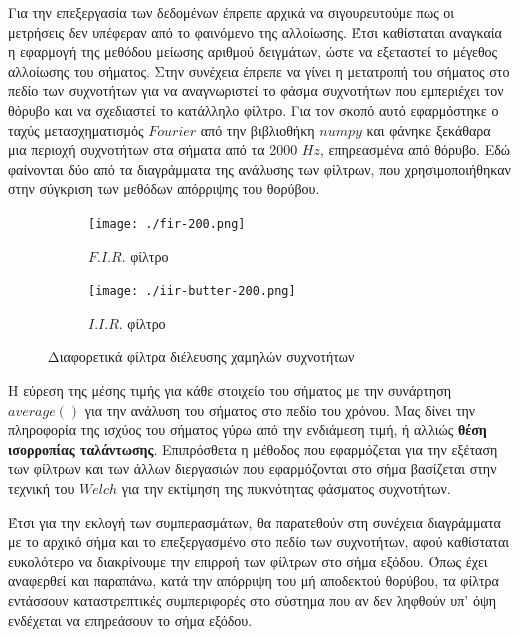 \documentclass[breaklines=true, 12pt]{article}
\begin{document}
Για την επεξεργασία των δεδομένων έπρεπε αρχικά να σιγουρευτούμε πως οι
μετρήσεις δεν υπέφεραν από το φαινόμενο της αλλοίωσης. Έτσι καθίσταται
αναγκαία η εφαρμογή της μεθόδου μείωσης αριθμού δειγμάτων, ώστε να εξεταστεί
το μέγεθος αλλοίωσης του σήματος. Στην συνέχεια έπρεπε να γίνει η μετατροπή
του σήματος στο πεδίο των συχνοτήτων για να αναγνωριστεί το φάσμα συχνοτήτων
που εμπεριέχει τον θόρυβο και να σχεδιαστεί το κατάλληλο φίλτρο. Για τον σκοπό
αυτό εφαρμόστηκε ο ταχύς μετασχηματισμός \(Fourier\) από την βιβλιοθήκη \(numpy\) και
φάνηκε ξεκάθαρα μια περιοχή συχνοτήτων στα σήματα από τα 2000 \(Hz\), επηρεασμένα
από θόρυβο. Εδώ φαίνονται δύο από τα διαγράμματα της ανάλυσης των φίλτρων, που
χρησιμοποιήθηκαν στην σύγκριση των μεθόδων απόρριψης του θορύβου.
\begin{figure}
\centering
\begin{subfigure}{.5\textwidth}
\centering
\texttt{[image: ./fir-200.png]}
\caption{\(F.I.R.\) φίλτρο}
\label{fig:sub1}
\end{subfigure}%
\begin{subfigure}{.5\textwidth}
\centering
\texttt{[image: ./iir-butter-200.png]}
\caption{\(I.I.R.\) φίλτρο}
\label{fig:sub2}
\end{subfigure}
\caption{Διαφορετικά φίλτρα διέλευσης χαμηλών συχνοτήτων}
\label{fig:test}
\end{figure}

Η εύρεση της μέσης τιμής για κάθε στοιχείο του σήματος με την συνάρτηση
\(average()\) για την ανάλυση του σήματος στο πεδίο του
χρόνου. Μας δίνει την πληροφορία της ισχύος του σήματος γύρω από την ενδιάμεση
τιμή, ή αλλιώς \textbf{θέση ισορροπίας ταλάντωσης}. Επιπρόσθετα η μέθοδος που
εφαρμόζεται για την εξέταση των φίλτρων και των άλλων διεργασιών που
εφαρμόζονται στο σήμα βασίζεται στην τεχνική του \(Welch\) για την εκτίμηση της
πυκνότητας φάσματος συχνοτήτων.

Έτσι για την εκλογή των συμπερασμάτων, θα παρατεθούν στη συνέχεια διαγράμματα
με το αρχικό σήμα και το επεξεργασμένο στο πεδίο των συχνοτήτων, αφού καθίσταται
ευκολότερο να διακρίνουμε την επιρροή των φίλτρων στο σήμα εξόδου. Όπως έχει
αναφερθεί και παραπάνω, κατά την απόρριψη του μή αποδεκτού θορύβου, τα φίλτρα
εντάσσουν καταστρεπτικές συμπεριφορές στο σύστημα που αν δεν ληφθούν
υπ' όψη ενδέχεται να επηρεάσουν το σήμα εξόδου.
\end{document}
